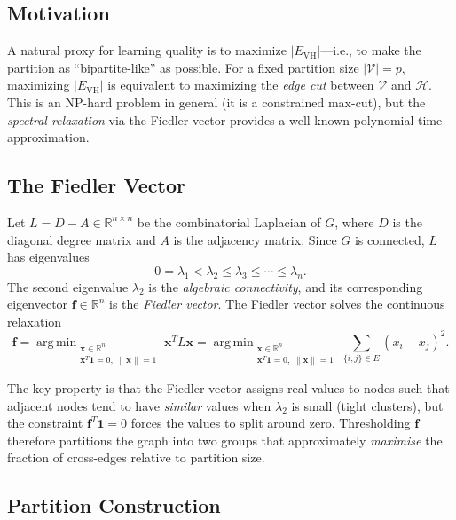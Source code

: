 \documentclass[11pt,a4paper]{article}
\DeclareMathOperator*{\argmin}{arg\,min}
\newcommand{\VV}{\mathcal{V}}
\newcommand{\HH}{\mathcal{H}}
\newcommand{\RR}{\mathbb{R}}
\begin{document}
\subsection{Motivation}

A natural proxy for learning quality is to maximize $|E_{\mathrm{VH}}|$---i.e., to make the partition as ``bipartite-like'' as possible.  For a fixed partition size $|\VV|=p$, maximizing $|E_{\mathrm{VH}}|$ is equivalent to maximizing the \emph{edge cut} between $\VV$ and $\HH$.  This is an NP-hard problem in general (it is a constrained max-cut), but the \emph{spectral relaxation} via the Fiedler vector provides a well-known polynomial-time approximation.

\subsection{The Fiedler Vector}\label{sec:fiedler}

Let $L = D - A \in \RR^{n\times n}$ be the combinatorial Laplacian of $G$, where $D$ is the diagonal degree matrix and $A$ is the adjacency matrix.  Since $G$ is connected, $L$ has eigenvalues
\[
  0 = \lambda_1 < \lambda_2 \leq \lambda_3 \leq \cdots \leq \lambda_n.
\]
The second eigenvalue $\lambda_2$ is the \emph{algebraic connectivity}, and its corresponding eigenvector $\mathbf{f} \in \RR^n$ is the \emph{Fiedler vector}.  The Fiedler vector solves the continuous relaxation
\[
  \mathbf{f} = \argmin_{\substack{\mathbf{x}\in\RR^n \\ \mathbf{x}^T\mathbf{1}=0,\;\|\mathbf{x}\|=1}} \mathbf{x}^T L \mathbf{x}
  = \argmin_{\substack{\mathbf{x}\in\RR^n \\ \mathbf{x}^T\mathbf{1}=0,\;\|\mathbf{x}\|=1}} \sum_{\{i,j\}\in E} (x_i - x_j)^2.
\]

The key property is that the Fiedler vector assigns real values to nodes such that adjacent nodes tend to have \emph{similar} values when $\lambda_2$ is small (tight clusters), but the constraint $\mathbf{f}^T\mathbf{1}=0$ forces the values to split around zero.  Thresholding $\mathbf{f}$ therefore partitions the graph into two groups that approximately \emph{maximise} the fraction of cross-edges relative to partition size.

\subsection{Partition Construction}
\end{document}

